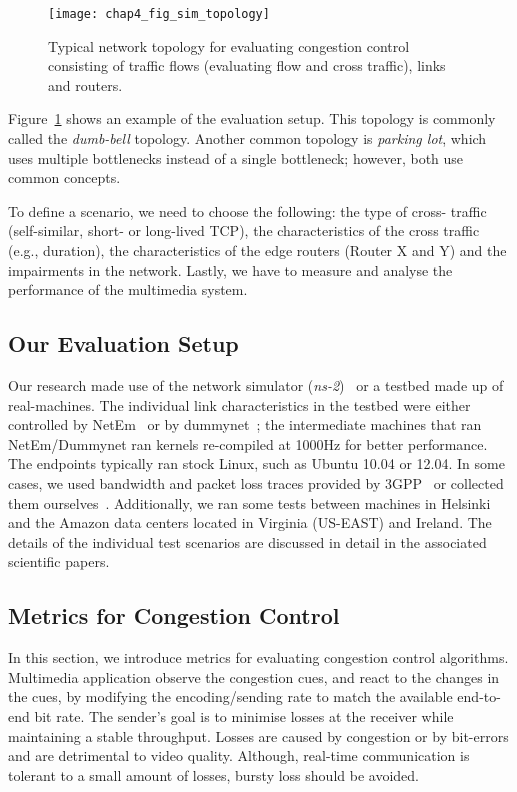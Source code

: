 \begin{figure}
\texttt{[image: chap4\_fig\_sim\_topology]}
\caption{Typical network topology for evaluating congestion control consisting
of traffic flows (evaluating flow and cross traffic), links and routers.}
\label{fig:4:topology}
\end{figure}


Figure~\ref{fig:4:topology} shows an example of the evaluation setup. This
topology is commonly called the \emph{dumb-bell} topology. Another common
topology is \emph{parking lot}, which uses multiple bottlenecks instead of a
single bottleneck; however, both use common concepts.


To define a scenario, we need to choose the following: the type of cross-
traffic (self-similar, short- or long-lived TCP), the characteristics of the
cross traffic (e.g., duration), the characteristics of the edge routers
(Router X and Y) and the impairments in the network. Lastly, we have to
measure and analyse the performance of the multimedia system.


\subsection{Our Evaluation Setup}

Our research made use of the network simulator (\emph{ns-2})~\cite{ns2} or a
testbed made up of real-machines. The individual link characteristics in the
testbed were either controlled by NetEm~\cite{netem} or by
dummynet~\cite{Carbone:2010p3502}; the intermediate machines that ran
NetEm/Dummynet ran kernels re-compiled at 1000Hz for better performance. The
endpoints typically ran stock Linux, such as Ubuntu 10.04 or 12.04. In some
cases, we used bandwidth and packet loss traces provided by
3GPP~\cite{s4.eval.bitrate} or collected them ourselves~\cite{sharmistha-thesis}. 
Additionally, we ran some tests between machines in Helsinki and the
Amazon data centers located in Virginia (US-EAST) and Ireland. The details of the
individual test scenarios are discussed in detail in the associated scientific 
papers.

\subsection{Metrics for Congestion Control}
\label{subsec.metrics}

In this section, we introduce metrics for evaluating congestion control
algorithms. Multimedia application observe the congestion cues, and react to
the changes in the cues, by modifying the encoding/sending rate to match the
available end-to-end bit rate. The sender's goal is to minimise losses at the
receiver while maintaining a stable throughput. Losses are caused by
congestion or by bit-errors and are detrimental to video quality. Although,
real-time communication is tolerant to a small amount of losses, bursty loss
should be avoided. 

